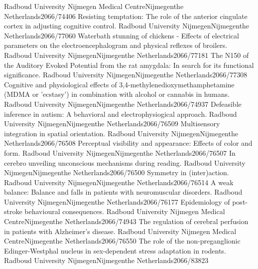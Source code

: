 	{Radboud University Nijmegen Medical Centre}{Nijmegen}{the Netherlands}{2066/74406}
	{Resisting temptation: The role of the anterior cingulate cortex in adjusting cognitive control.}
	{Radboud University Nijmegen}{Nijmegen}{the Netherlands}{2066/77060}
	{Waterbath stunning of chickens - Effects of electrical parameters on the electroencephalogram and physical reflexes of broilers.}
	{Radboud University Nijmegen}{Nijmegen}{the Netherlands}{2066/77181}
	{The N150 of the Auditory Evoked Potential from the rat amygdala: In search for its functional significance.}
	{Radboud University Nijmegen}{Nijmegen}{the Netherlands}{2066/77308}
	{Cognitive and physiological effects of 3,4-methylenedioxymethamphetamine (MDMA or 'ecstasy') in combination with alcohol or cannabis in humans.}
	{Radboud University Nijmegen}{Nijmegen}{the Netherlands}{2066/74937}
	{Defeasible inference in autism: A behavioral and electrophysiogical approach.}
	{Radboud University Nijmegen}{Nijmegen}{the Netherlands}{2066/76509}
	{Multisensory integration in spatial orientation.}
	{Radboud University Nijmegen}{Nijmegen}{the Netherlands}{2066/76508}
	{Perceptual visibility and appearance: Effects of color and form.}
	{Radboud University Nijmegen}{Nijmegen}{the Netherlands}{2066/76507}
	{In cerebro unveiling unconscious mechanisms during reading.}
	{Radboud University Nijmegen}{Nijmegen}{the Netherlands}{2066/76500}
	{Symmetry in (inter)action.}
	{Radboud University Nijmegen}{Nijmegen}{the Netherlands}{2066/76514}
	{A weak balance: Balance and falls in patients with neuromuscular disorders.}
	{Radboud University Nijmegen}{Nijmegen}{the Netherlands}{2066/76177}
	{Epidemiology of post-stroke behavioural consequences.}
	{Radboud University Nijmegen Medical Centre}{Nijmegen}{the Netherlands}{2066/74943}
	{The regulation of cerebral perfusion in patients with Alzheimer's disease.}
	{Radboud University Nijmegen Medical Centre}{Nijmegen}{the Netherlands}{2066/76550}
	{The role of the non-preganglionic Edinger-Westphal nucleus in sex-dependent stress adaptation in rodents.}
	{Radboud University Nijmegen}{Nijmegen}{the Netherlands}{2066/83823}
